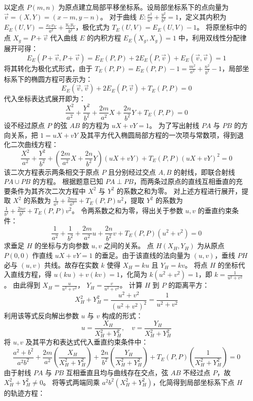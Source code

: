 \begin{solution}
以定点 $P(m,n)$ 为原点建立局部平移坐标系。设局部坐标系下的点向量为 $\vec{v} = (X, Y) = (x-m, y-n)$。
对于曲线 $E: \frac{x^2}{a^2} + \frac{y^2}{b^2} = 1$，定义其内积为 $E_E(U, V) = \frac{x_U x_V}{a^2} + \frac{y_U y_V}{b^2}$，极化式为 $T_E(U, V) = E_E(U, V) - 1$。
将原坐标中的点 $X_g = P + \vec{v}$ 代入曲线 $E$ 的内积方程 $E_E(X_g, X_g) = 1$ 中，利用双线性分配律展开可得：
\[ E_E(P+\vec{v}, P+\vec{v}) = E_E(P,P) + 2E_E(P, \vec{v}) + E_E(\vec{v},\vec{v}) = 1 \]
将其转化为极化式形式，由于 $T_E(P,P) = E_E(P,P) - 1 = \frac{m^2}{a^2} + \frac{n^2}{b^2} - 1$，局部坐标系下的椭圆方程可表示为：
\[ E_E(\vec{v}, \vec{v}) + 2E_E(P, \vec{v}) + T_E(P,P) = 0 \]
代入坐标表达式展开即为：
\[ \frac{X^2}{a^2} + \frac{Y^2}{b^2} + \frac{2m}{a^2}X + \frac{2n}{b^2}Y + T_E(P,P) = 0 \]
设不经过原点 $P$ 的弦 $AB$ 的方程为 $uX + vY = 1$。
为了写出射线 $PA$ 与 $PB$ 的方向关系，把 $1 = uX + vY$ 及其平方代入椭圆局部方程的一次项与常数项，得到退化二次曲线方程：
\[ \frac{X^2}{a^2} + \frac{Y^2}{b^2} + \left(\frac{2m}{a^2}X + \frac{2n}{b^2}Y\right)(uX + vY) + T_E(P,P)(uX + vY)^2 = 0 \]
该二次方程表示两条相交于原点 $P$ 且分别经过交点 $A, B$ 的射线，即联合射线 $PA \cup PB$ 的方程。
根据题意已知 $PA \perp PB$，而两条过原点的直线互相垂直的充要条件为其齐次二次方程中 $X^2$ 与 $Y^2$ 的系数之和为零。
对上述方程进行展开，提取 $X^2$ 的系数为 $\frac{1}{a^2} + \frac{2m u}{a^2} + T_E(P,P)u^2$，提取 $Y^2$ 的系数为 $\frac{1}{b^2} + \frac{2n v}{b^2} + T_E(P,P)v^2$。
令两系数之和为零，得出关于参数 $u, v$ 的垂直约束条件：
\[ \frac{1}{a^2} + \frac{1}{b^2} + \frac{2m}{a^2}u + \frac{2n}{b^2}v + T_E(P,P)(u^2 + v^2) = 0 \]
求垂足 $H$ 的坐标与方向参数 $u, v$ 之间的关系。
点 $H(X_H, Y_H)$ 为从原点 $P(0,0)$ 作直线 $uX + vY = 1$ 的垂足。由于该直线的法向量为 $(u, v)$，垂线 $PH$ 必与 $(u, v)$ 共线。故存在实数 $k$ 使得 $X_H = ku$ 且 $Y_H = kv$。
将点 $H$ 的坐标代入直线方程，得 $u(ku) + v(kv) = 1$，化简为 $k(u^2 + v^2) = 1$，即 $k = \frac{1}{u^2+v^2}$。
由此得到 $X_H = \frac{u}{u^2+v^2}$， $Y_H = \frac{v}{u^2+v^2}$。
计算 $H$ 到 $P$ 的距离平方：
\[ X_H^2 + Y_H^2 = \frac{u^2+v^2}{(u^2+v^2)^2} = \frac{1}{u^2+v^2} \]
利用该等式反向解出参数 $u$ 与 $v$ 构成的形式：
\[ u = \frac{X_H}{X_H^2 + Y_H^2}, \quad v = \frac{Y_H}{X_H^2 + Y_H^2} \]
将 $u, v$ 及其平方和表达式代入垂直约束条件中：
\[ \frac{a^2+b^2}{a^2b^2} + \frac{2m}{a^2}\left(\frac{X_H}{X_H^2+Y_H^2}\right) + \frac{2n}{b^2}\left(\frac{Y_H}{X_H^2+Y_H^2}\right) + T_E(P,P)\left(\frac{1}{X_H^2+Y_H^2}\right) = 0 \]
由于射线 $PA$ 与 $PB$ 互相垂直且均与曲线存在交点，弦 $AB$ 不经过点 $P$，故 $X_H^2 + Y_H^2 \neq 0$。
将等式两端同乘 $a^2b^2(X_H^2 + Y_H^2)$，化简得到局部坐标系下点 $H$ 的轨迹方程：

\end{solution}
